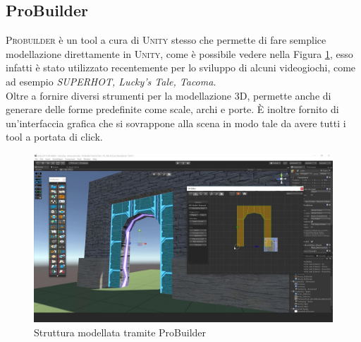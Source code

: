 \documentclass[12pt, openany]{book}
\begin{document}
	\subsection{ProBuilder}
	\textsc{Probuilder} è un tool a cura di \textsc{Unity} stesso che permette di fare semplice modellazione direttamente in \textsc{Unity}, come è possibile vedere nella Figura \ref{fig:proBuilder}, esso infatti è stato utilizzato recentemente per lo sviluppo di alcuni videogiochi, come ad esempio \emph{SUPERHOT, Lucky's Tale, Tacoma}.\\
	Oltre a fornire diversi strumenti per la modellazione 3D, permette anche di generare delle forme predefinite come scale, archi e porte. È inoltre fornito di un'interfaccia grafica che si sovrappone alla scena in modo tale da avere tutti i tool a portata di click.
		\begin{figure}[H]
		\centering
		\includegraphics[width=1\linewidth]{"Immagini/probuilder.jpg"}
		\caption{Struttura modellata tramite ProBuilder}
		\label{fig:proBuilder}
	\end{figure}
\end{document}
